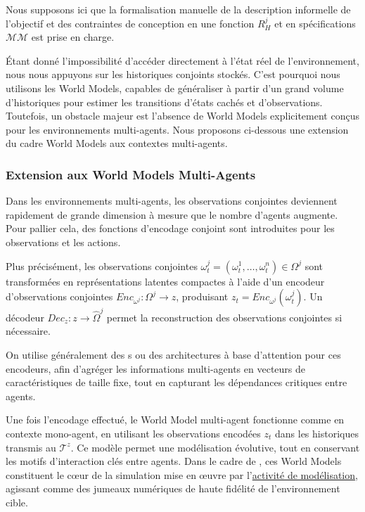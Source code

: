 Nous supposons ici que la formalisation manuelle de la description informelle de l'objectif et des contraintes de conception en une fonction $R^j_H$ et en spécifications $\mathcal{MM}$ est prise en charge.

Étant donné l'impossibilité d'accéder directement à l'état réel de l'environnement, nous nous appuyons sur les historiques conjoints stockés. C'est pourquoi nous utilisons les World Models, capables de généraliser à partir d'un grand volume d'historiques pour estimer les transitions d'états cachés et d'observations. Toutefois, un obstacle majeur est l'absence de World Models explicitement conçus pour les environnements multi-agents. Nous proposons ci-dessous une extension du cadre World Models aux contextes multi-agents.

\subsubsection*{Extension aux World Models Multi-Agents}

Dans les environnements multi-agents, les observations conjointes deviennent rapidement de grande dimension à mesure que le nombre d'agents augmente. Pour pallier cela, des fonctions d'encodage conjoint sont introduites pour les observations et les actions.

Plus précisément, les observations conjointes $\omega_t^{j} = (\omega_t^1, \dots, \omega_t^n) \in \Omega^{j}$ sont transformées en représentations latentes compactes à l'aide d'un encodeur d'observations conjointes $Enc_{\omega^j} : \Omega^j \rightarrow z$, produisant $z_t = Enc_{\omega^j}(\omega_t^j)$. Un décodeur $Dec_z : z \rightarrow \hat{\Omega}^j$ permet la reconstruction des observations conjointes si nécessaire.

On utilise généralement des s ou des architectures à base d'attention pour ces encodeurs, afin d'agréger les informations multi-agents en vecteurs de caractéristiques de taille fixe, tout en capturant les dépendances critiques entre agents.

Une fois l'encodage effectué, le World Model multi-agent fonctionne comme en contexte mono-agent, en utilisant les observations encodées $z_t$ dans les historiques transmis au  $\mathcal{T}^{z}$. Ce modèle permet une modélisation évolutive, tout en conservant les motifs d'interaction clés entre agents. Dans le cadre de , ces World Models constituent le cœur de la simulation mise en œuvre par l'\hyperref[sec:modelling]{activité de modélisation}, agissant comme des jumeaux numériques de haute fidélité de l'environnement cible.

